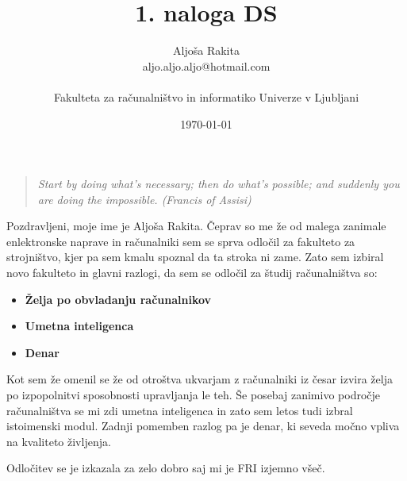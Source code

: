 \documentclass[11pt,a4paper]{article}
\title {1. naloga DS}
\author{Aljoša Rakita\\
aljo.aljo.aljo@hotmail.com\\
\ \\
Fakulteta za računalništvo in informatiko Univerze v Ljubljani
\date{\today}         
}
\begin{document}
\maketitle


\begin{quote}
\textit{Start by doing what's necessary; then do what's possible; and suddenly you are doing the impossible. (Francis of Assisi)}
\end{quote}

Pozdravljeni, moje ime je Aljoša Rakita. Čeprav so me že od malega zanimale enlektronske naprave in računalniki sem se sprva odločil za fakulteto za strojništvo, kjer pa sem kmalu spoznal da ta stroka ni zame. Zato sem izbiral novo fakulteto in glavni razlogi, da sem se odločil za študij računalništva so:

\begin{itemize}

\item \textbf{Želja po obvladanju računalnikov}

\item\textbf{Umetna inteligenca}

\item \textbf{Denar}
\end{itemize}


Kot sem že omenil se že od otroštva ukvarjam z računalniki iz česar izvira želja po izpopolnitvi sposobnosti upravljanja le teh. Še posebaj zanimivo področje računalništva se mi zdi umetna inteligenca in zato sem letos tudi izbral istoimenski modul. Zadnji pomemben razlog pa je denar, ki seveda močno vpliva na kvaliteto življenja. 

Odločitev se je izkazala za zelo dobro saj mi je FRI izjemno všeč.
\end{document}
